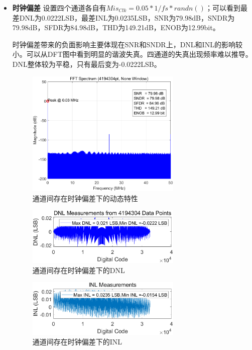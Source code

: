 \documentclass[cs4size,a4paper]{ctexart}
\numberwithin{equation}{section}
\numberwithin{table}{section}
\numberwithin{figure}{section}
\begin{document}
\begin{itemize}
		\item \textbf{时钟偏差} 设置四个通道各自有$Mis_{Clk} = 0.05 * 1/fs * randn()$；可以看到最差DNL为0.0222LSB，最差INL为0.0235LSB，SNR为79.98dB，SNDR为79.98dB，SFDR为84.98dB，THD为149.21dB，ENOB为12.99bit。
		
		时钟偏差带来的负面影响主要体现在SNR和SNDR上，DNL和INL的影响较小。可以从DFT图中看到明显的谐波失真。四通道的失真出现频率难以推导。DNL整体较为平稳，只有最后变为-0.0222LSB。
		\begin{figure}[H]
			\centering
			\includegraphics[width=0.7\textwidth]{pic/TIC/DFT.png}
			\caption{通道间存在时钟偏差下的动态特性} 
		\end{figure}

		\begin{figure}[H]
			\centering
			\includegraphics[width=0.7\textwidth]{pic/TIC/DNL.png}
			\caption{通道间存在时钟偏差下的DNL} 
		\end{figure}

		\begin{figure}[H]
			\centering
			\includegraphics[width=0.7\textwidth]{pic/TIC/INL.png}
			\caption{通道间存在时钟偏差下的INL} 
		\end{figure}
	\end{itemize}
\end{document}
